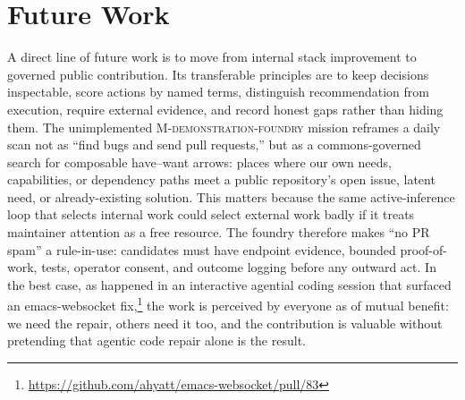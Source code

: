 \section{Future Work} \label{sec:future-work}



A direct line of future work is to move from internal stack improvement to governed public contribution.
Its transferable principles are to keep decisions inspectable, score actions by named terms, distinguish recommendation from execution, require external evidence, and record honest gaps rather than hiding them.  The unimplemented \textsc{M-demonstration-foundry} mission reframes a daily scan not as ``find bugs and send pull requests,'' but as a commons-governed search for composable have--want arrows: places where our own needs, capabilities, or dependency paths meet a public repository's open issue, latent need, or already-existing solution. This matters because the same active-inference loop that selects internal work could select external work badly if it treats maintainer attention as a free resource. The foundry therefore makes ``no PR spam'' a rule-in-use: candidates must have endpoint evidence, bounded proof-of-work, tests, operator consent, and outcome logging before any outward act. In the best case, as happened in an interactive agential coding session that surfaced an emacs-websocket fix,\footnote{\url{https://github.com/ahyatt/emacs-websocket/pull/83}} the work is perceived by everyone as of mutual benefit: we need the repair, others need it too, and the contribution is valuable without pretending that agentic code repair alone is the result.


